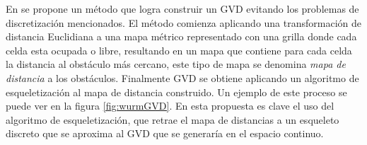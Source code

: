 En \cite{wurm2008coordinated} se propone un método que logra construir un GVD evitando los problemas de discretización mencionados. El método comienza aplicando una transformación de distancia Euclidiana \cite{meijster2002general} a una mapa métrico representado con una grilla donde cada celda esta ocupada o libre, resultando en un mapa que contiene para cada celda la distancia al obstáculo más cercano, este tipo de mapa se denomina \emph{mapa de distancia} a los obstáculos. Finalmente GVD se obtiene aplicando un algoritmo de esqueletización \cite{zhang1984fast} al mapa de distancia construido. Un ejemplo de este proceso se puede ver en la figura \ref{fig:wurmGVD}. En esta propuesta es clave el uso del algoritmo de esqueletización, que retrae el mapa de distancias a un esqueleto discreto que se aproxima al GVD que se generaría en el espacio continuo.   


